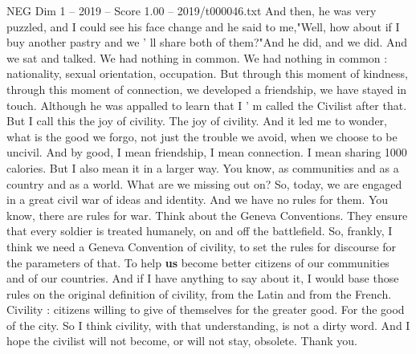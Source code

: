 \begin{textsample}{NEG Dim 1 – 2019 – Score 1.00 – 2019/t000046.txt}
And then, he was very puzzled, and I could see his face change and he said to me,"Well, how about if I buy another pastry and we ' ll share both of them?"And he did, and we did.
And we sat and talked.
We had nothing in common.
We had nothing in common : nationality, sexual orientation, occupation.
But through this moment of kindness, through this moment of connection, we developed a friendship, we have stayed in touch.
Although he was appalled to learn that I ' m called the Civilist after that.
But I call this the joy of civility.
The joy of civility.
And it led me to wonder, what is the good we forgo, not just the trouble we avoid, when we choose to be uncivil.
And by good, I mean friendship, I mean connection.
I mean sharing 1000 calories.
But I also mean it in a larger way.
You know, as communities and as a country and as a world.
What are we missing out on?
So, today, we are engaged in a great civil war of ideas and identity.
And we have no rules for them.
You know, there are rules for war.
Think about the Geneva Conventions.
They ensure that every soldier is treated humanely, on and off the battlefield.
So, frankly, I think we need a Geneva Convention of civility, to set the rules for discourse for the parameters of that.
To help \textbf{us} become better citizens of our communities and of our countries.
And if I have anything to say about it, I would base those rules on the original definition of civility, from the Latin and from the French.
Civility : citizens willing to give of themselves for the greater good.
For the good of the city.
So I think civility, with that understanding, is not a dirty word.
And I hope the civilist will not become, or will not stay, obsolete.
Thank you.

\end{textsample}
